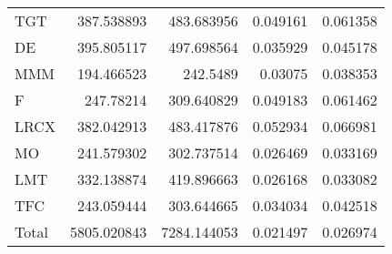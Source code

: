 \documentclass{gji}
\begin{document}
{\begin{tabular}{@{}lrrrr}
  TGT &  387.538893 &  483.683956 & 0.049161 & 0.061358 \\
   DE &  395.805117 &  497.698564 & 0.035929 & 0.045178 \\
  MMM &  194.466523 &    242.5489 &  0.03075 & 0.038353 \\
    F &   247.78214 &  309.640829 & 0.049183 & 0.061462 \\
 LRCX &  382.042913 &  483.417876 & 0.052934 & 0.066981 \\
   MO &  241.579302 &  302.737514 & 0.026469 & 0.033169 \\
  LMT &  332.138874 &  419.896663 & 0.026168 & 0.033082 \\
  TFC &  243.059444 &  303.644665 & 0.034034 & 0.042518 \\
Total & 5805.020843 & 7284.144053 & 0.021497 & 0.026974 \\
\hline
\end{tabular}}

\label{lastpage}
\end{document}
